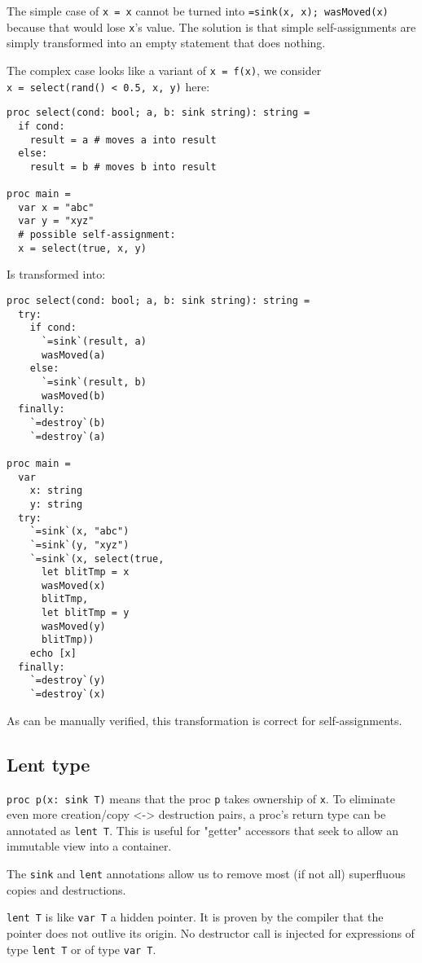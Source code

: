 The simple case of \texttt{x\ =\ x} cannot be turned into
\texttt{=sink(x,\ x);\ wasMoved(x)} because that would lose \texttt{x}'s
value. The solution is that simple self-assignments are simply
transformed into an empty statement that does nothing.

The complex case looks like a variant of \texttt{x\ =\ f(x)}, we
consider \texttt{x\ =\ select(rand()\ \textless{}\ 0.5,\ x,\ y)} here:

\begin{verbatim}
proc select(cond: bool; a, b: sink string): string =
  if cond:
    result = a # moves a into result
  else:
    result = b # moves b into result

proc main =
  var x = "abc"
  var y = "xyz"
  # possible self-assignment:
  x = select(true, x, y)
\end{verbatim}

Is transformed into:

\begin{verbatim}
proc select(cond: bool; a, b: sink string): string =
  try:
    if cond:
      `=sink`(result, a)
      wasMoved(a)
    else:
      `=sink`(result, b)
      wasMoved(b)
  finally:
    `=destroy`(b)
    `=destroy`(a)

proc main =
  var
    x: string
    y: string
  try:
    `=sink`(x, "abc")
    `=sink`(y, "xyz")
    `=sink`(x, select(true,
      let blitTmp = x
      wasMoved(x)
      blitTmp,
      let blitTmp = y
      wasMoved(y)
      blitTmp))
    echo [x]
  finally:
    `=destroy`(y)
    `=destroy`(x)
\end{verbatim}

As can be manually verified, this transformation is correct for
self-assignments.

\hypertarget{lent-type}{%
\subsection{Lent type}\label{lent-type}}

\texttt{proc\ p(x:\ sink\ T)} means that the proc \texttt{p} takes
ownership of \texttt{x}. To eliminate even more creation/copy
\textless-\textgreater{} destruction pairs, a proc's return type can be
annotated as \texttt{lent\ T}. This is useful for "getter" accessors
that seek to allow an immutable view into a container.

The \texttt{sink} and \texttt{lent} annotations allow us to remove most
(if not all) superfluous copies and destructions.

\texttt{lent\ T} is like \texttt{var\ T} a hidden pointer. It is proven
by the compiler that the pointer does not outlive its origin. No
destructor call is injected for expressions of type \texttt{lent\ T} or
of type \texttt{var\ T}.

